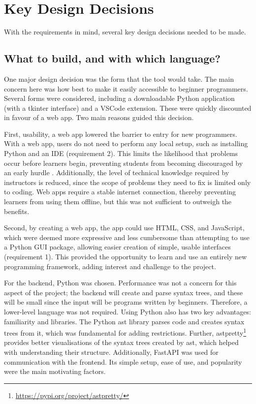 \section{Key Design Decisions}

With the requirements in mind, several key design decisions needed to be made.

\subsection{What to build, and with which language?}

One major design decision was the form that the tool would take. The main concern here was how best to make it easily accessible to beginner programmers. Several forms were considered, including a downloadable Python application (with a tkinter interface) and a VSCode extension. These were quickly discounted in favour of a web app. Two main reasons guided this decision.

First, usability, a web app lowered the barrier to entry for new programmers. With a web app, users do not need to perform any local setup, such as installing Python and an IDE (requirement 2). This limits the likelihood that problems occur before learners begin, preventing students from becoming discouraged by an early hurdle \cite{mills_coding_2025}. Additionally, the level of technical knowledge required by instructors is reduced, since the scope of problems they need to fix is limited only to coding. Web apps require a stable internet connection, thereby preventing learners from using them offline, but this was not sufficient to outweigh the benefits.

Second, by creating a web app, the app could use HTML, CSS, and JavaScript, which were deemed more expressive and less cumbersome than attempting to use a Python GUI package, allowing easier creation of simple, usable interfaces (requirement 1). This provided the opportunity to learn and use an entirely new programming framework, adding interest and challenge to the project.

For the backend, Python was chosen. Performance was not a concern for this aspect of the project; the backend will create and parse syntax trees, and these will be small since the input will be programs written by beginners. Therefore, a lower-level language was not required. Using Python also has two key advantages: familiarity and libraries. The Python ast library parses code and creates syntax trees from it, which was fundamental for adding restrictions. Further, astpretty\footnote{\href{https://pypi.org/project/astpretty/}{https://pypi.org/project/astpretty/}} provides better visualisations of the syntax trees created by ast, which helped with understanding their structure. Additionally, FastAPI was used for communication with the frontend. Its simple setup, ease of use, and popularity were the main motivating factors.

